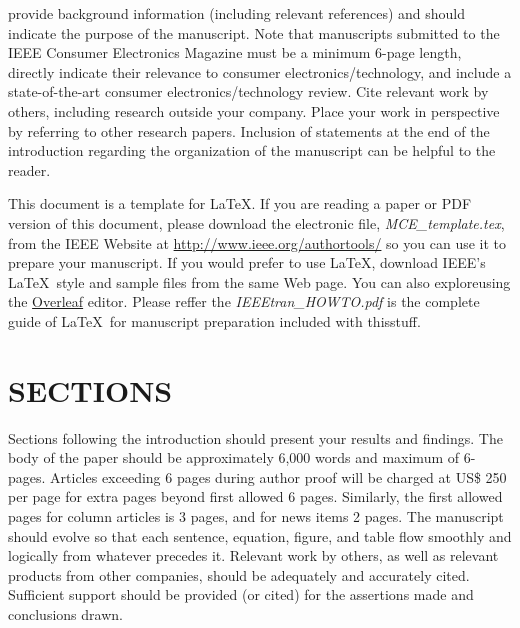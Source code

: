 \documentclass{IEEEmce}
\begin{document}
\enlargethispage{10pt}


 provide background information (including relevant references) and should indicate the purpose of the manuscript. Note that manuscripts submitted to the IEEE Consumer Electronics Magazine must be a minimum 6-page length, directly indicate their relevance to consumer electronics/technology, and include a state-of-the-art consumer electronics/technology review. Cite relevant work by others, including research outside your company. Place your work in perspective by referring to other research papers. Inclusion of statements at the end of the introduction regarding the organization of the manuscript can be helpful to the reader.

This document is a template for \LaTeX. If you are reading a paper or PDF version of this document, please download the electronic file, \textit{MCE\_template.tex}, from the IEEE Website at \href{http://www.ieee.org/authortools/}{http://www.ieee.org/authortools/} so you can use it to prepare your manuscript. If you would prefer to use \LaTeX, download IEEE's \LaTeX\ style and sample files from the same Web page. You can also explore\break using the \href{https://www.overleaf.com/blog/278-how-to-use-overleaf-with-ieee-collabratec-your-quick-guide-to-getting-started}{Overleaf} editor. Please reffer the \textit{IEEEtran\_HOWTO.pdf} is the complete guide of \LaTeX\ for manuscript preparation included with this\break stuff.


\section{SECTIONS} 

Sections following the introduction should present your results and findings. The body of the paper should be approximately 6,000 words and maximum of 6-pages. Articles exceeding 6 pages during author proof will be charged at US\$ 250 per page for extra pages beyond first allowed 6 pages. Similarly, the first allowed pages for column articles is 3 pages, and for news items 2 pages. The manuscript should evolve so that each sentence, equation, figure, and table flow smoothly and logically from whatever precedes it. Relevant work by others, as well as relevant products from other companies, should be adequately and accurately cited. Sufficient support should be provided (or cited) for the assertions made and conclusions drawn.
\end{document}
